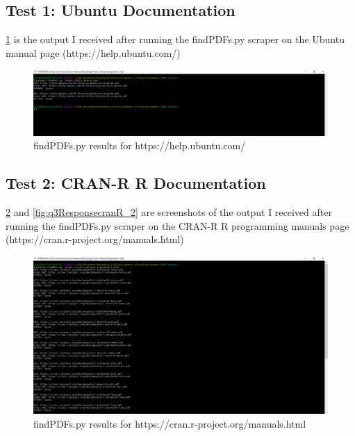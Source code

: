 \documentclass[12pt]{article}
\begin{document}
\subsection*{Test 1: Ubuntu Documentation} 
\ref{fig:q3ResponseUbuntu} is the output I received after running the findPDFs.py scraper on the Ubuntu manual page (https://help.ubuntu.com/)
\begin{figure}[H]
    \centering
    \includegraphics[trim=0 20 400 20, clip, width=\textwidth] {Q3/q3_ubuntuHelp.png}
    \caption{findPDFs.py results for https://help.ubuntu.com/}
    \label{fig:q3ResponseUbuntu}
\end{figure}

\subsection*{Test 2: CRAN-R R Documentation} 
\ref{fig:q3ResponsecranR_1} and \ref{fig:q3ResponsecranR_2} are screenshots of the output I received after running the findPDFs.py scraper on the CRAN-R R programming manuals page (https://cran.r-project.org/manuals.html)
\begin{figure}[H]
    \centering
    \includegraphics[trim=0 0 400 20, clip, width=\textwidth] {Q3/q3_cranRManuals.png}
    \caption{findPDFs.py results for https://cran.r-project.org/manuals.html}
    \label{fig:q3ResponsecranR_1}
\end{figure}
\end{document}
